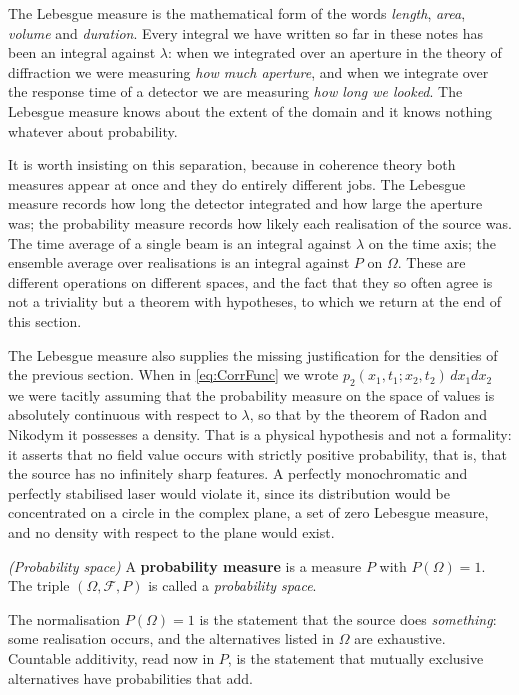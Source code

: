 		The Lebesgue measure \citep{lebesgue1902integrale} is the mathematical form of the words
		\textit{length}, \textit{area}, \textit{volume} and \textit{duration}. Every integral we
		have written so far in these notes has been an integral against $\lambda$: when we
		integrated over an aperture in the theory of diffraction we were measuring \textit{how
		much aperture}, and when we integrate over the response time of a detector we are
		measuring \textit{how long we looked}. The Lebesgue measure knows about the extent of
		the domain and it knows nothing whatever about probability.

		It is worth insisting on this separation, because in coherence theory both measures
		appear at once and they do entirely different jobs. The Lebesgue measure records
		how long the detector integrated and how large the aperture was; the probability measure
		records how likely each realisation of the source was. The time average of a single
		beam is an integral against $\lambda$ on the time axis; the ensemble average over
		realisations is an integral against $P$ on $\Omega$. These are different operations on
		different spaces, and the fact that they so often agree is not a triviality but a
		theorem with hypotheses, to which we return at the end of this section.

		The Lebesgue measure also supplies the missing justification for the densities of the
		previous section. When in \eqref{eq:CorrFunc} we wrote
		$p_{2}(x_{1},t_{1};x_{2},t_{2})\,dx_{1}dx_{2}$ we were tacitly assuming that the
		probability measure on the space of values is absolutely continuous with respect to
		$\lambda$, so that by the theorem of Radon and Nikodym
		\citep{nikodym1930generalisation} it possesses a density. That is a physical hypothesis
		and not a formality: it asserts that no field value occurs with strictly positive
		probability, that is, that the source has no infinitely sharp features. A perfectly
		monochromatic and perfectly stabilised laser would violate it, since its distribution
		would be concentrated on a circle in the complex plane, a set of zero Lebesgue measure,
		and no density with respect to the plane would exist.

		\begin{myDef}
			\textit{(Probability space)} A \textbf{probability measure} is a measure $P$ with
			$P(\Omega)=1$. The triple $(\Omega,\mathcal{F},P)$ is called a \emph{probability
			space}.
		\end{myDef}

		The normalisation $P(\Omega)=1$ is the statement that the source does \textit{something}:
		some realisation occurs, and the alternatives listed in $\Omega$ are exhaustive.
		Countable additivity, read now in $P$, is the statement that mutually exclusive
		alternatives have probabilities that add.

